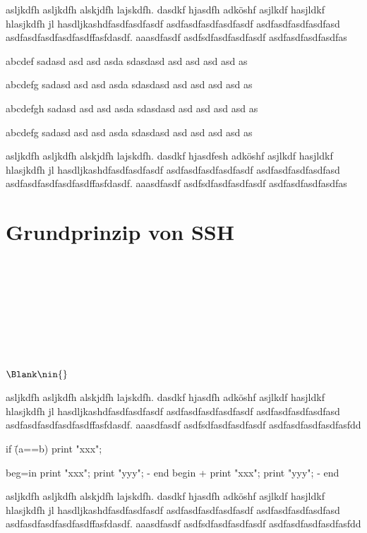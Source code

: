 \documentclass[ngerman,pdf]{wkcms}    %
\begin{document}
asljkdfh asljkdfh alskjdfh lajskdfh. dasdkf hjasdfh adköshf asjlkdf hasjldkf
hlasjkdfh jl hasdljkashdfasdfasdfasdf asdfasdfasdfasdfasdf asdfasdfasdfasdfasd
asdfasdfasdfasdfasdffasfdasdf. aaasdfasdf asdfsdfasdfasdfasdf
asdfasdfasdfasdfas
\begin{longitemize}
  \item[abcdef]   sadasd asd asd asda sdasdasd asd asd asd asd as
  \item[abcdefg]  sadasd asd asd asda sdasdasd asd asd asd asd as
  \item[abcdefgh] sadasd asd asd asda sdasdasd asd asd asd asd as
  \item[abcdefg]  sadasd asd asd asda sdasdasd asd asd asd asd as
\end{longitemize}
asljkdfh asljkdfh alskjdfh lajskdfh. dasdkf hjasdfesh adköshf asjlkdf hasjldkf
hlasjkdfh jl hasdljkashdfasdfasdfasdf asdfasdfasdfasdfasdf asdfasdfasdfasdfasd
asdfasdfasdfasdfasdffasfdasdf. aaasdfasdf asdfsdfasdfasdfasdf asdfasdfasdfasdfas
\newpage

\section{Grundprinzip von SSH}
\bzgl \bzw \ca \Dh \evtl \etc \ggf \iAllg \oAe \uAe \usf \usw \vgl \zB \\
\cf \cp \ie \eg \etc \wrt \viz \vs \Wlog \\
 \\
  \\
 \\
 \\
  \\
 \\
 $\Blank \nin \{\}$

asljkdfh asljkdfh alskjdfh lajskdfh. dasdkf hjasdfh adköshf asjlkdf hasjldkf
hlasjkdfh jl hasdljkashdfasdfasdfasdf asdfasdfasdfasdfasdf asdfasdfasdfasdfasd
asdfasdfasdfasdfasdffasfdasdf. aaasdfasdf asdfsdfasdfasdfasdf asdfasdfasdfasdfasfdd 
\begin{program}
if \=(a==b)
   \>print "xxx"; 

beg\tab=in
  print "xxx";      
  print "yyy";      
  \tab-
end
begin
  \tab+
  print "xxx";   
  print "yyy";  
  \tab-
end
\end{program}
asljkdfh asljkdfh alskjdfh lajskdfh. dasdkf hjasdfh adköshf asjlkdf hasjldkf
hlasjkdfh jl hasdljkashdfasdfasdfasdf asdfasdfasdfasdfasdf asdfasdfasdfasdfasd
asdfasdfasdfasdfasdffasfdasdf. aaasdfasdf asdfsdfasdfasdfasdf asdfasdfasdfasdfasfdd 
\end{document}
